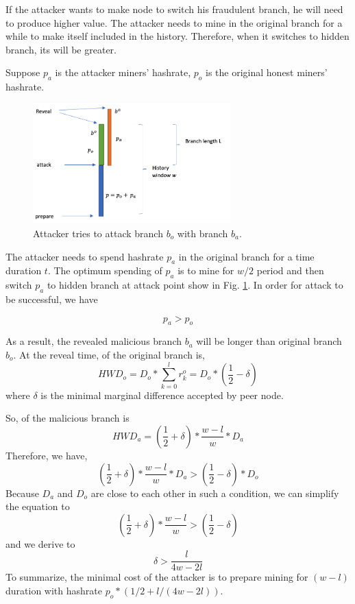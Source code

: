 \documentclass[conference]{IEEEtran}
\begin{document}
If the attacker wants to make node to switch his fraudulent branch, he will need to produce higher  value. The attacker needs to mine in the original branch for a while to make itself included in the history. Therefore, when it switches to hidden branch, its  will be greater. 

Suppose $p_a$ is the attacker miners' hashrate, $p_o$ is the original honest miners' hashrate.

\begin{figure}[htbp]
\centerline{\includegraphics[width=3in]{figure.png}}
\caption{Attacker tries to attack branch $b_o$ with branch $b_a$.}
\label{fig1}
\end{figure}

The attacker needs to spend hashrate $p_a$ in the original branch for a time duration $t$. The optimum spending of $p_a$ is to mine for $w/2$ period and then switch $p_a$ to hidden branch at attack point show in Fig. \ref{fig1}. In order for attack to be successful, we have

\begin{equation}
    p_a > p_o\label{eq_hash_power}
\end{equation}

As a result, the revealed malicious branch $b_a$ will be longer than original branch $b_o$. 
At the reveal time,  of the original branch is,
\begin{equation}
    H\!W\!D_o = D_o * \sum_{k=0}^{l} r_{k}^{o} =  D_o * (\frac{1}{2} - \delta)\label{eq_hwd_orig}
\end{equation}
where $\delta$ is the minimal marginal difference accepted by peer node. 

So,  of the malicious branch is
\begin{equation}
    H\!W\!D_a= (\frac{1}{2} + \delta) * \frac{w-l}{w} * D_a\label{eq_hwd_mal}
\end{equation}
Therefore, we have,
\begin{equation}
    (\frac{1}{2} + \delta) * \frac{w-l}{w} * D_a> (\frac{1}{2}-\delta) * D_o\label{eq_hwd_criteria}
\end{equation}
Because $D_a$ and $D_o$ are close to each other in such a condition, we can simplify the equation to 
\begin{equation}
    (\frac{1}{2} + \delta) * \frac{w-l}{w} > (\frac{1}{2}-\delta)\label{eq_hwd_crit_simplified}
\end{equation}
and we derive to
\begin{equation}
\delta>\frac{l}{4w-2l}\label{eq_delta}
\end{equation}
To summarize, the minimal cost of the attacker is to prepare mining for $(w-l)$ duration with hashrate $p_o *(1/2+l/(4w-2l))$.
\end{document}
